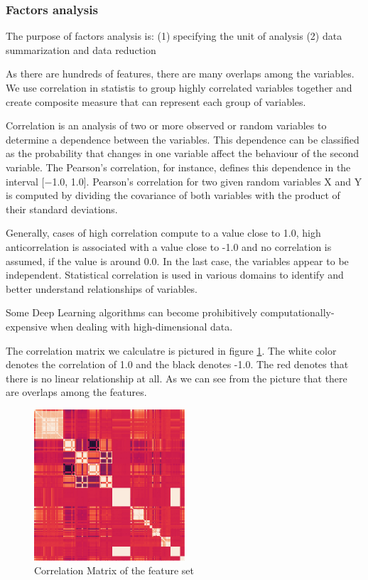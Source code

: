 \documentclass[5p]{elsarticle}
\begin{document}
\subsubsection{Factors analysis}
The purpose of factors analysis is: (1) specifying the unit of analysis (2) data summarization and data reduction

As there are hundreds of features, there are many overlaps among the variables. We use correlation in statistis to group highly correlated variables together and create composite measure that can represent each group of variables.

Correlation is an analysis of two or more observed or random variables to determine a dependence between the variables. This dependence can be classified as the probability that changes in one variable affect the behaviour of the second variable. The Pearson’s correlation, for instance, defines this dependence in the interval [−1.0, 1.0]. Pearson’s correlation for two given random variables X and Y is computed by dividing the covariance of both variables with the product of their standard deviations.

Generally, cases of high correlation compute to a value close to 1.0, high anticorrelation is associated with a value close to -1.0 and no correlation is assumed, if the value is around 0.0. In the last case, the variables appear to be independent. Statistical correlation is used in various domains to identify and better understand relationships of variables.

Some Deep Learning algorithms can become prohibitively computationally-expensive when dealing with high-dimensional data.

The correlation matrix we calculatre is pictured in figure \ref{fig:Correlation_matrix}. The white color denotes the correlation of 1.0 and the black denotes -1.0. The red denotes that there is no linear relationship at all. As we can see from the picture that there are overlaps among the features. 

\begin{figure}[h]
    \centering
    \includegraphics[width=0.5\textwidth]{Correlation_Matrix.png}
    \caption{Correlation Matrix of the feature set}
    \label{fig:Correlation_matrix}
\end{figure}
\end{document}
